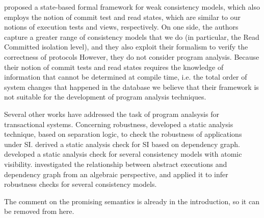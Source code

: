 \citeauthor{seebelieve} \cite{seebelieve} proposed a state-based formal framework for weak consistency models, 
which also employs the notion of commit test and read states, which are similar 
to our notions of execution tests and views, respectively. On one side, the authors capture 
a greater range of consistency models that we do (in particular, the Read Committed isolation level), 
and they also exploit their formalism to verify the correctness of protocols
However, they do not consider program analysis. Because their notion of commit tests and read states requires 
the knowledge of information that cannot be determined at compile time, i.e. the total order of system changes that happened in the database 
we believe that their framework is not suitable for the development of program analysis techniques.

Several other works have addressed the task of program analsysis for transactional systems. 
Concerning robustness, 
\citeauthor{dias-tm} \cite{dias-tm} developed a static analysis technique, based on separation logic, 
to check the robustness of applications under SI. \citeauthor{fekete-tods} \cite{fekete-tods} derived 
a static analysis check for SI based on dependency graph. \citeauthor{giovanni_concur16} \cite{giovanni_concur16} 
developed a static analysis check for several consistency models with atomic visibility. 
\citeauthor{laws} \cite{laws} investigated the relationship between abstract 
executions and dependency graph from an algebraic perspective, and applied it to infer 
robustness checks for several consistency models. 


\ac{The comment on the promising semantics is already in the introduction, so it can be removed from here.}
